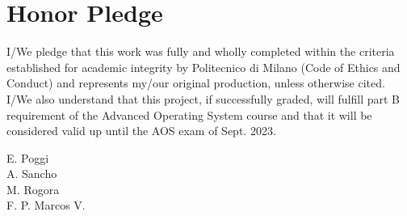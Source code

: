 \documentclass[10pt,a4]{article}
\begin{document}
\section{Honor Pledge}

I/We pledge that this work was fully and wholly completed within the criteria
established for academic integrity by Politecnico di Milano (Code of Ethics and
Conduct) and represents my/our original production, unless otherwise cited.
\\
I/We also understand that this project, if successfully graded,  will fulfill part B requirement of the
Advanced Operating System course and that it will be considered valid up until
the AOS exam of Sept. 2023. 

\begin{flushright}
E. Poggi\\
A. Sancho\\
M. Rogora \\
F. P. Marcos V.\\
\end{flushright}
\end{document}

